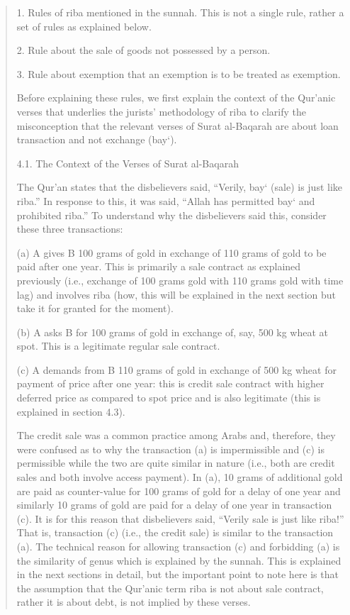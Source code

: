 \begin{quote}
1. Rules of riba mentioned in the sunnah. This is not a single rule, rather a set of rules as explained below.

2. Rule about the sale of goods not possessed by a person.

3. Rule about exemption that an exemption is to be treated as exemption.

Before explaining these rules, we first explain the context of the Qur'anic verses that underlies the jurists' methodology of riba to clarify the misconception that the relevant verses of Surat al-Baqarah are about loan transaction and not exchange (bay‘).

4.1. The Context of the Verses of Surat al-Baqarah

The Qur'an states that the disbelievers said, “Verily, bay‘ (sale) is just like riba.” In response to this, it was said, “Allah has permitted bay‘ and prohibited riba.” To understand why the disbelievers said this, consider these three transactions:

(a) A gives B 100 grams of gold in exchange of 110 grams of gold to be paid after one year. This is primarily a sale contract as explained previously (i.e., exchange of 100 grams gold with 110 grams gold with time lag) and involves riba (how, this will be explained in the next section but take it for granted for the moment).

(b) A asks B for 100 grams of gold in exchange of, say, 500 kg wheat at spot. This is a legitimate regular sale contract.

(c) A demands from B 110 grams of gold in exchange of 500 kg wheat for payment of price after one year: this is credit sale contract with higher deferred price as compared to spot price and is also legitimate (this is explained in section 4.3).

The credit sale was a common practice among Arabs and, therefore, they were confused as to why the transaction (a) is impermissible and (c) is permissible while the two are quite similar in nature (i.e., both are credit sales and both involve access payment). In (a), 10 grams of additional gold are paid as counter-value for 100 grams of gold for a delay of one year and similarly 10 grams of gold are paid for a delay of one year in transaction (c). It is for this reason that disbelievers said, “Verily sale is just like riba!” That is, transaction (c) (i.e., the credit sale) is similar to the transaction (a). The technical reason for allowing transaction (c) and forbidding (a) is the similarity of genus which is explained by the sunnah. This is explained in the next sections in detail, but the important point to note here is that the assumption that the Qur'anic term riba is not about sale contract, rather it is about debt, is not implied by these verses.


\end{quote}
